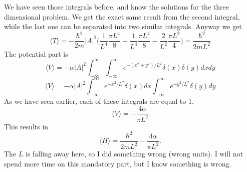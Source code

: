 \documentclass{scrartcl}
\begin{document}
We have seen those integrals before, and know the solutions for the three dimensional problem. We get the exact same result from the second integral, while the last one can be separated into two similar integrals. Anyway we get
\begin{equation}
\langle T\rangle = -\frac{\hbar^2}{2m}|A|^2\bigg(\frac{1}{L^4}\frac{\pi L^4}{8}+\frac{1}{L^4}\frac{\pi L^4}{8}-\frac{2}{L^2}\frac{\pi L^2}{4}\bigg)=\frac{\hbar^2}{2mL^2}
\end{equation}
The potential part is
\begin{equation*}
\langle V\rangle = -\alpha|A|^2\int_{-\infty}^{\infty}\int_{-\infty}^{\infty}e^{-(x^2+y^2)/L^2}\delta(x)\delta(y)dxdy
\end{equation*}
\begin{equation*}
\langle V\rangle = -\alpha|A|^2\int_{-\infty}^{\infty}e^{-x^2/L^2}\delta(x)dx\int_{-\infty}^{\infty}e^{-y^2/L^2}\delta(y)dy
\end{equation*}
As we have seen earlier, each of these integrals are equal to 1. 
\begin{equation}
\langle V\rangle = -\frac{4\alpha}{\pi L^2}
\end{equation}
This results in 
\begin{equation}
\langle H\rangle = \frac{\hbar^2}{2mL^2}-\frac{4\alpha}{\pi L^2}.
\end{equation}
The $L$ is falling away here, so I did something wrong (wrong units). I will not spend more time on this mandatory part, but I know something is wrong. 
\end{document}
